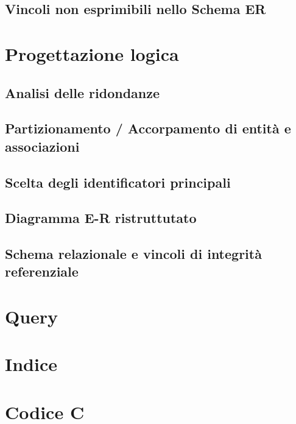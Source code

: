 \documentclass[11pt]{article}
\begin{document}
	\subsection{Vincoli non esprimibili nello Schema ER}
\section{Progettazione logica}
	\subsection{Analisi delle ridondanze}
	\subsection{Partizionamento / Accorpamento di entità e associazioni}
	\subsection{Scelta degli identificatori principali}
	\subsection{Diagramma E-R ristruttutato}
	\subsection{Schema relazionale e vincoli di integrità referenziale}
\section{Query}
\section{Indice}
\section{Codice C}
\end{document}

